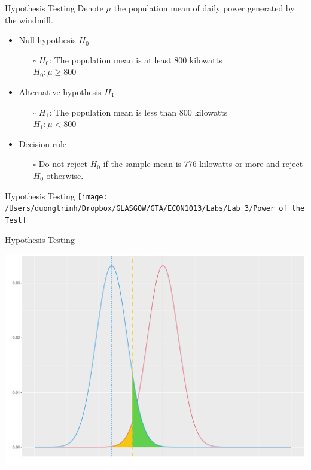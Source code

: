 \documentclass[
  10pt,
  ignorenonframetext,
]{beamer}
\begin{document}
\begin{frame}{Hypothesis Testing}
\protect\hypertarget{hypothesis-testing}{}
Denote \(\mu\) the population mean of daily power generated by the
windmill.

\begin{itemize}
    \item Null hypothesis $H_0$
        \pause
        \begin{itemize}
            \item [$\square$] $H_0$: The population mean is at least 800 kilowatts\\
                  $H_0: \mu \geq 800$
    \end{itemize}
    \vspace{1.5mm}
    \item Alternative hypothesis $H_1$
        \pause
        \begin{itemize}
            \item [$\square$] $H_1$: The population mean is less than 800 kilowatts\\
                  $H_1: \mu < 800$\\
        \end{itemize}
    \vspace{1.5mm}
    \item Decision rule
        \pause
        \begin{itemize}
            \item [$\square$] Do not reject $H_0$ if the sample mean is 776 kilowatts or more and reject $H_0$ otherwise. \\
        \end{itemize}
    \vspace{1.5mm}
\end{itemize}
\end{frame}

\begin{frame}{Hypothesis Testing}
\protect\hypertarget{hypothesis-testing-1}{}
\texttt{[image: /Users/duongtrinh/Dropbox/GLASGOW/GTA/ECON1013/Labs/Lab 3/Power of the Test]}
\end{frame}

\begin{frame}{Hypothesis Testing}
\protect\hypertarget{hypothesis-testing-2}{}
\begin{center}\includegraphics[width=0.8\linewidth]{ECON1013_Tutorial-4-_files/figure-beamer/unnamed-chunk-7-1} \end{center}
\end{frame}
\end{document}
